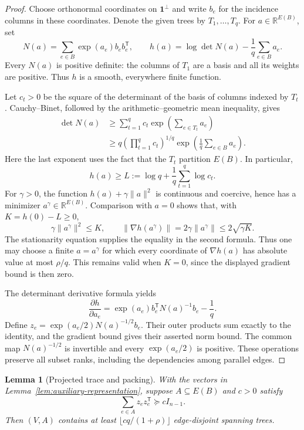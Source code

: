 \documentclass[11pt]{amsart}
\newtheorem{lemma}[theorem]{Lemma}
\theoremstyle{definition}
\theoremstyle{remark}
\numberwithin{equation}{section}
\begin{document}
\begin{proof}
Choose orthonormal coordinates on $\mathbf1^\perp$ and write $b_e$ for
the incidence columns in these coordinates.  Denote the given trees by
$T_1,\ldots,T_q$.  For $a\in\mathbb R^{E(B)}$, set
\[
 N(a)=\sum_{e\in B}\exp(a_e)b_eb_e^{\mathsf T},
 \qquad
 h(a)=\log\det N(a)-\frac1q\sum_{e\in B}a_e.
\]
Every $N(a)$ is positive definite: the columns of $T_1$ are a basis and
all its weights are positive.  Thus $h$ is a smooth, everywhere finite
function.

Let $c_t>0$ be the square of the determinant of the basis of columns
indexed by $T_t$.  Cauchy--Binet, followed by the arithmetic--geometric
mean inequality, gives
\begin{align*}
 \det N(a)
 &\geq\sum_{t=1}^q c_t\exp\left(\sum_{e\in T_t}a_e\right)\\
 &\geq q\left(\prod_{t=1}^q c_t\right)^{1/q}
       \exp\left(\frac1q\sum_{e\in B}a_e\right).
\end{align*}
Here the last exponent uses the fact that the $T_t$ partition $E(B)$.
In particular,
\[
 h(a)\geq L:=\log q+\frac1q\sum_{t=1}^q\log c_t.
\]
For $\gamma>0$, the function $h(a)+\gamma\|a\|^2$ is continuous and
coercive, hence has a minimizer $a^\gamma\in\mathbb R^{E(B)}$.
Comparison with $a=0$ shows that, with $K=h(0)-L\geq0$,
\[
 \gamma\|a^\gamma\|^2\leq K,
 \qquad
 \|\nabla h(a^\gamma)\|
 =2\gamma\|a^\gamma\|\leq2\sqrt{\gamma K}.
\]
The stationarity equation supplies the equality in the second formula.
Thus one may choose a finite $a=a^\gamma$ for which every coordinate of
$\nabla h(a)$ has absolute value at most $\rho/q$.  This remains valid
when $K=0$, since the displayed gradient bound is then zero.

The determinant derivative formula yields
\[
 \frac{\partial h}{\partial a_e}
 =\exp(a_e)b_e^{\mathsf T}N(a)^{-1}b_e-\frac1q.
\]
Define $z_e=\exp(a_e/2)N(a)^{-1/2}b_e$.  Their outer products sum
exactly to the identity, and the gradient bound gives their asserted
norm bound.  The common map $N(a)^{-1/2}$ is invertible and every
$\exp(a_e/2)$ is positive.  These operations preserve all subset ranks,
including the dependencies among parallel edges.
\end{proof}

\begin{lemma}[Projected trace and packing]
\label{lem:projected-trace-packing}
With the vectors in Lemma~\ref{lem:auxiliary-representation}, suppose
$A\subseteq E(B)$ and $c>0$ satisfy
\[
 \sum_{e\in A}z_ez_e^{\mathsf T}\succeq cI_{n-1}.
\]
Then $(V,A)$ contains at least
$\lfloor cq/(1+\rho)\rfloor$ edge-disjoint spanning trees.
\end{lemma}
\end{document}
